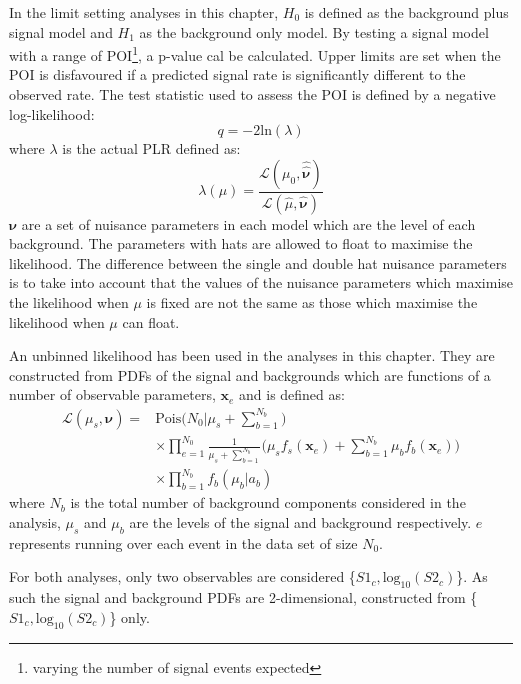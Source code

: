 \par
In the limit setting analyses in this chapter, $H_0$ is defined as the background plus signal model and $H_1$ as the background only model.
By testing a signal model with a range of POI\footnote{varying the number of signal events expected}, a p-value cal be calculated. 
Upper limits are set when the POI is disfavoured if a predicted signal rate is significantly different to the observed rate.
The test statistic used to assess the POI is defined by a negative log-likelihood:
\begin{equation}
    q = -2 \text{ln}(\lambda)
\end{equation}
where $\lambda$ is the actual PLR defined as:
\begin{equation}
    \lambda(\mu) = \frac{\mathcal{L}(\mu_0, \boldsymbol{\hat{\hat{\nu}}})}{\mathcal{L}(\hat{\mu}, \boldsymbol{\hat{\nu}})}
\end{equation}
$\boldsymbol{\nu}$ are a set of nuisance parameters in each model which are the level of each background.
The parameters with hats are allowed to float to maximise the likelihood.
The difference between the single and double hat nuisance parameters is to take into account that the values of the nuisance parameters which maximise the likelihood when $\mu$ is fixed are not the same as those which maximise the likelihood when $\mu$ can float.
\par
An unbinned likelihood has been used in the analyses in this chapter.
They are constructed from PDFs of the signal and backgrounds which are functions of a number of observable parameters, $\boldsymbol{x}_e$ and is defined as:
\begin{equation}
\begin{split}
    \mathcal{L}(\mu_s,\boldsymbol{\nu}) =& \text{Pois} \bigg(N_0 | \mu_s + \sum^{N_b}_{b=1}\bigg) \\
                                         & \times \prod^{N_0}_{e=1} \frac{1}{\mu_s + \sum^{N_b}_{b=1}} \bigg( \mu_s f_s (\boldsymbol{x}_e) + \sum^{N_b}_{b=1} \mu_b f_b(\boldsymbol{x}_e) \bigg) \\
                                         & \times \prod^{N_b}_{b=1} f_b(\mu_b | a_b)
\end{split}
\end{equation}
where $N_b$ is the total number of background components considered in the analysis, $\mu_s$ and $\mu_b$ are the levels of the signal and background respectively. 
$e$ represents running over each event in the data set of size $N_0$.
\par
For both analyses, only two observables are considered \{$S1_c,\text{log}_{10}(S2_c)$\}.
As such the signal and background PDFs are 2-dimensional, constructed from \{$S1_c,\text{log}_{10}(S2_c)$\} only.

